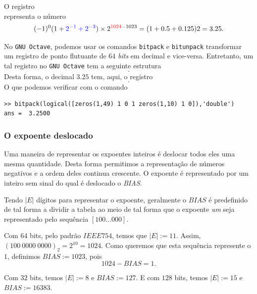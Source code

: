 \begin{ex}
O registro
\begin{equation}
[0|\RED{100~0000~0000} |\BLU{101}0~0000~0000\ldots 0000~0000]
\end{equation}
representa o número
\begin{equation}
(-1)^0(1+{\color{blue}{2^{-1}+2^{-3}}})\times  2^{{\color{red}{1024}}-1023}=(1+0.5+0.125)2=3.25.
\end{equation}
\end{ex}

\begin{obs}
  No \verb+GNU Octave+, podemos usar os comandos \verb+bitpack+ e \verb+bitunpack+ transformar um registro de ponto flutuante de $64$ \emph{bits} em decimal e vice-versa. Entretanto, um tal registro no \verb+GNU Octave+ tem a seguinte estrutura
  \begin{equation}
    [m_{52}m_{51}m_{50}\ldots m_{1}|c_0c_1c_2\cdots c_{10}|s].
  \end{equation}
Desta forma, o decimal $3.25$ tem, aqui, o registro
\begin{equation}
  [000\ldots 0101|000\ldots 01|0].
\end{equation}
O que podemos verificar com o comando
\begin{verbatim}
>> bitpack(logical([zeros(1,49) 1 0 1 zeros(1,10) 1 0]),'double')
ans =  3.2500
\end{verbatim}
\end{obs}


\subsubsection{O expoente deslocado}

Uma maneira de representar os expoentes inteiros é deslocar todos eles uma mesma quantidade. Desta forma permitimos a representação de números negativos e a ordem deles continua crescente. O expoente é representado por um inteiro sem sinal do qual é deslocado o \emph{BIAS}.

Tendo $|E|$ dígitos para representar o expoente, geralmente o $BIAS$ é predefinido de tal forma a dividir a tabela ao meio de tal forma que o expoente \textit{um} seja representado pelo sequência $[100\ldots 000]$.

\begin{ex}
  Com $64$ bits, pelo padrão $IEEE754$, temos que $|E|:=11$. Assim, $(100~0000~0000)_2=2^{10}=1024$. Como queremos que esta sequência represente o $1$, definimos $BIAS:=1023$, pois
  \begin{equation}  1024-BIAS=1. \end{equation}

  Com $32$ bits, temos $|E|:=8$ e $BIAS:=127$. E com $128$ bits, temos $|E|:=15$ e $BIAS:=16383$.
\end{ex}

